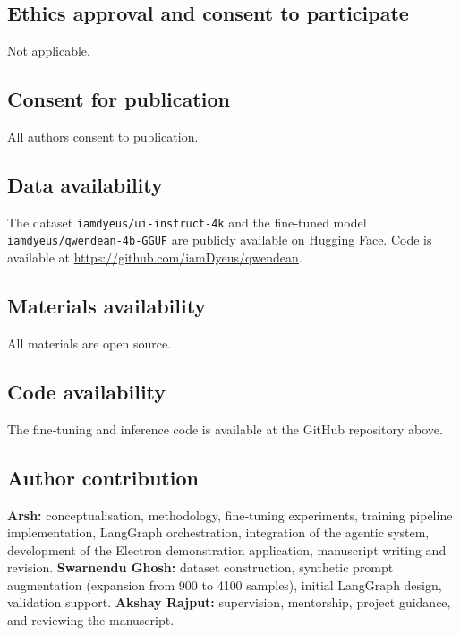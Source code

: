\documentclass[pdflatex,sn-mathphys-num]{sn-jnl}
\theoremstyle{thmstyleone}
\theoremstyle{thmstyletwo}
\theoremstyle{thmstylethree}
\begin{document}
\subsection*{Ethics approval and consent to participate}
Not applicable.

\subsection*{Consent for publication}
All authors consent to publication.

\subsection*{Data availability}
The dataset \texttt{iamdyeus/ui-instruct-4k} and the fine‑tuned model \texttt{iamdyeus/qwendean-4b-GGUF} are publicly available on Hugging Face. Code is available at \url{https://github.com/iamDyeus/qwendean}.

\subsection*{Materials availability}
All materials are open source.

\subsection*{Code availability}
The fine‑tuning and inference code is available at the GitHub repository above.

\subsection*{Author contribution}
\textbf{Arsh:} conceptualisation, methodology, fine‑tuning experiments, training pipeline implementation, LangGraph orchestration, integration of the agentic system, development of the Electron demonstration application, manuscript writing and revision. 
\textbf{Swarnendu Ghosh:} dataset construction, synthetic prompt augmentation (expansion from 900 to 4100 samples), initial LangGraph design, validation support. 
\textbf{Akshay Rajput:} supervision, mentorship, project guidance, and reviewing the manuscript.
\end{document}
